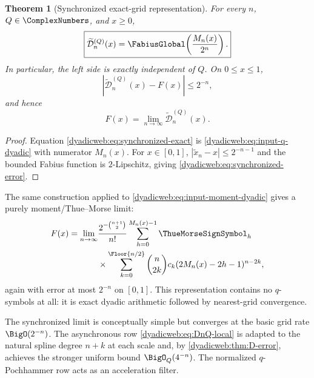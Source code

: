 \documentclass[11pt,oneside]{article}
\newtheorem{theorem}{Theorem}[section]
\theoremstyle{definition}
\theoremstyle{remark}
\begin{document}
\begin{theorem}[Synchronized exact-grid representation]
\label{dyadicweb:thm:synchronized}
For every $n$, $Q\in\ComplexNumbers$, and $x\ge0$,
\begin{equation}
 \boxed{
 \widetilde{\mathcal D}_n^{(Q)}(x)
 =\FabiusGlobal\!\left(\frac{M_n(x)}{2^n}\right).}           \label{dyadicweb:eq:synchronized-exact}
\end{equation}
In particular, the left side is exactly independent of $Q$.  On $0\le x\le1$,
\begin{equation}
 \left|\widetilde{\mathcal D}_n^{(Q)}(x)-F(x)\right|
 \le2^{-n},                                                \label{dyadicweb:eq:synchronized-error}
\end{equation}
and hence
\begin{equation}
 F(x)=\lim_{n\to\infty}\widetilde{\mathcal D}_n^{(Q)}(x). \label{dyadicweb:eq:synchronized-limit}
\end{equation}
\end{theorem}

\begin{proof}
Equation \eqref{dyadicweb:eq:synchronized-exact} is
\eqref{dyadicweb:eq:input-q-dyadic} with numerator $M_n(x)$.  For $x\in[0,1]$,
$|\widetilde x_n-x|\le2^{-n-1}$ and the bounded Fabius function is $2$-Lipschitz, giving
\eqref{dyadicweb:eq:synchronized-error}.
\end{proof}

The same construction applied to \eqref{dyadicweb:eq:input-moment-dyadic} gives a purely
moment/Thue--Morse limit:
\begin{align}
 F(x)=\lim_{n\to\infty}
 &\frac{2^{-\binom{n+1}{2}}}{n!}
 \sum_{h=0}^{M_n(x)-1}\ThueMorseSignSymbol_h                              \notag\\
 &\times\sum_{k=0}^{\Floor{n/2}}
 \binom n{2k}c_k(2M_n(x)-2h-1)^{n-2k},                   \label{dyadicweb:eq:synchronized-moment-limit}
\end{align}
again with error at most $2^{-n}$ on $[0,1]$.  This representation contains no $q$-symbols at
all: it is exact dyadic arithmetic followed by nearest-grid convergence.

The synchronized limit is conceptually simple but converges at the basic grid rate
$\BigO(2^{-n})$.  The asynchronous row \eqref{dyadicweb:eq:DnQ-local} is adapted to the natural spline
degree $n+k$ at each scale and, by \cref{dyadicweb:thm:D-error}, achieves the stronger uniform bound
$\BigO_Q(4^{-n})$.  The normalized $q$-Pochhammer row acts as an acceleration filter.
\end{document}
